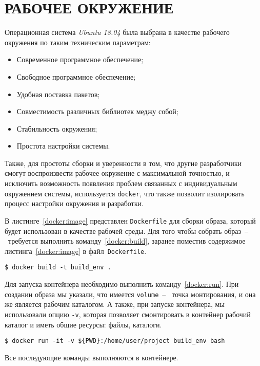\chapter{РАБОЧЕЕ ОКРУЖЕНИЕ}


Операционная система \textit{Ubuntu 18.04} была выбрана в качестве рабочего
окружения по таким техническим параметрам:

\begin{itemize}
    \item Современное программное обеспечение;
    \item Свободное программное обеспечение;
    \item Удобная поставка пакетов;
    \item Совместимость различных библиотек меджу собой;
    \item Стабильность окружения;
    \item Простота настройки системы.
\end{itemize}

Также, для простоты сборки и уверенности в том, что другие разработчики смогут
воспроизвести рабочее окружение с максимальной точностью, и исключить
возможность появления проблем связанных с индивидуальным окружением системы,
используется \texttt{docker}, что также позволит изолировать процесс настройки
окружения и разработки.

В листинге~\ref{docker:image} представлен \texttt{Dockerfile} для сборки образа,
который будет использован в качестве рабочей среды. Для того чтобы собрать
образ~--~требуется выполнить команду~\ref{docker:build}, заранее поместив
содержимое листинга~\ref{docker:image} в файл~\texttt{Dockerfile}.

\begin{lstlisting}[caption={Сборка образа}, label={docker:build}]
$ docker build -t build_env .
\end{lstlisting}

Для запуска контейнера необходимо выполнить команду~\ref{docker:run}. При создании
образа мы указали, что имеется \texttt{volume}~--~ точка монтирования, и она же
является рабочим каталогом. А также, при запуске контейнера, мы использовали
опцию \texttt{-v}, которая позволяет смонтировать в контейнер рабочий каталог и
иметь общие ресурсы: файлы, каталоги.

\begin{lstlisting}[caption={Запуск контейнера}, label={docker:run}]
$ docker run -it -v ${PWD}:/home/user/project build_env bash
\end{lstlisting}

Все последующие команды выполняются в контейнере.
